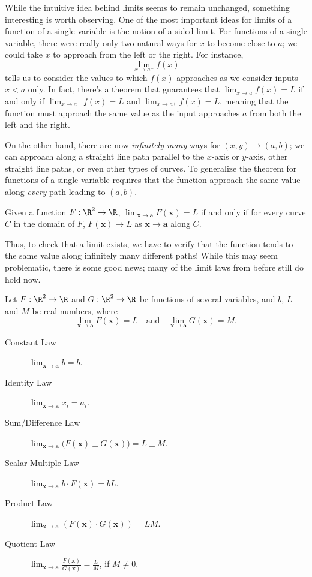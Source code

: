 \documentclass{ximera}
\newcommand{\point}[1]{\left(#1\right)} %
\newcommand{\pt}[1]{\mathbf{#1}} %
\newcommand{\Lim}[2]{\lim_{#1 \to #2}}
\begin{document}
While the intuitive idea behind limits seems to remain unchanged, something interesting is worth observing.  One of the most important ideas for limits of a function of a single variable is the notion of a sided limit.  For functions of a single variable, there were really only two natural ways for $x$ to become close to $a$; we could take $x$ to approach from the left or the right.  For instance,
\[
\Lim{x}{a^-}f(x) 
\]
tells us to consider the values to which $f(x)$ approaches as we consider inputs $x<a$ only.  In fact, there's a theorem that guarantees that $\Lim{x}{a} f(x) = L$ if and only if $\Lim{x}{a^-}f(x) =L$ and $\Lim{x}{a^+}f(x) =L$, meaning that the function must approach the same value as the input approaches $a$ from both the left and the right.

On the other hand, there are now \emph{infinitely many} ways for $\point{x,y} \to \point{a,b}$; we can approach along a straight line path parallel to the $x$-axis or $y$-axis, other straight line paths, or even other types of curves.  To generalize the theorem for functions of a single variable requires that the function approach the same value along \emph{every} path leading to $\point{a,b}$.

\begin{theorem}
Given a function $F:\R^2\to\R$, $\Lim{\pt{x}}{\pt{a}}F(\pt{x}) = L$ if and only if for every curve $C$ in the domain of $F$, $F(\pt{x}) \to L$ as $\pt{x} \to \pt{a}$ along $C$.
\end{theorem}

Thus, to check that a limit exists, we have to verify that the function tends to the same value along infinitely many different paths!  While this may seem problematic, there is some good news; many of the limit laws from before still do hold now.

\begin{theorem}
  Let $F:\R^2\to \R$ and $G:\R^2\to \R$ be functions of several
  variables, and $b$, $L$ and $M$ be real numbers, where
  \[
  \lim_{\pt{x}\to\pt{a}}F(\pt{x}) = L \quad \text{and}\quad \lim_{\pt{x}\to\pt{a}} G(\pt{x}) = M.
  \]
\begin{description}
\item[Constant Law] $\lim_{\pt{x}\to \pt{a}} b = b$.
\item[Identity Law] $\lim_{\pt{x}\to \pt{a}} x_i = a_i$.
\item[Sum/Difference Law] $\lim_{\pt{x}\to \pt{a}}\big(F(\pt{x})\pm G(\pt{x})\big) = L\pm M$.
\item[Scalar Multiple Law] $\lim_{\pt{x}\to \pt{a}} b\cdot F(\pt{x}) = bL$.
\item[Product Law] $\lim_{\pt{x}\to \pt{a}} \left(F(\pt{x})\cdot G(\pt{x})\right) = LM$.
\item[Quotient Law] $\lim_{\pt{x}\to \pt{a}} \frac{F(\pt{x})}{G(\pt{x})} = \frac{L}{M}$, if $M\neq 0$.
\end{description}
\end{theorem}
\end{document}
